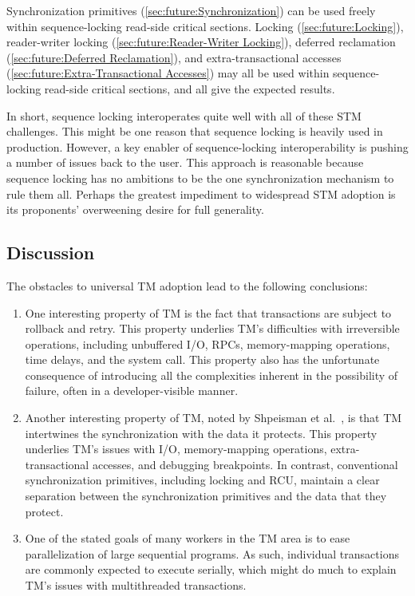 Synchronization primitives (\cref{sec:future:Synchronization})
can be used freely within sequence-locking read-side critical sections.
Locking (\cref{sec:future:Locking}),
reader-writer locking (\cref{sec:future:Reader-Writer Locking}),
deferred reclamation (\cref{sec:future:Deferred Reclamation}),
and extra-transactional accesses
(\cref{sec:future:Extra-Transactional Accesses})
may all be used within sequence-locking read-side critical sections,
and all give the expected results.


In short, sequence locking interoperates quite well with all of these
STM challenges.
This might be one reason that sequence locking is heavily used in
production.
However, a key enabler of sequence-locking interoperability is pushing
a number of issues back to the user.
This approach is reasonable because sequence locking has no ambitions
to be the one synchronization mechanism to rule them all.
Perhaps the greatest impediment to widespread STM adoption is its
proponents' overweening desire for full generality.

\subsection{Discussion}
\label{sec:future:Discussion}

The obstacles to universal TM adoption lead to the following
conclusions:

\begin{enumerate}
\item	One interesting property of TM is the fact that transactions are
	subject to rollback and retry.
	This property underlies TM's difficulties with irreversible
	operations, including unbuffered I/O, RPCs, memory-mapping
	operations, time delays, and the  system call.
	This property also has the unfortunate consequence of introducing
	all the complexities inherent in the possibility of failure,
	often in a developer-visible manner.
\item	Another interesting property of TM, noted by
	Shpeisman et al.~\cite{TatianaShpeisman2009CppTM}, is that TM
	intertwines the synchronization with the data it protects.
	This property underlies TM's issues with I/O, memory-mapping
	operations, extra-transactional accesses, and debugging
	breakpoints.
	In contrast, conventional synchronization primitives, including
	locking and RCU, maintain a clear separation between the
	synchronization primitives and the data that they protect.
\item	One of the stated goals of many workers in the TM area is to
	ease parallelization of large sequential programs.
	As such, individual transactions are commonly expected to
	execute serially, which might do much to explain TM's issues
	with multithreaded transactions.
\end{enumerate}

